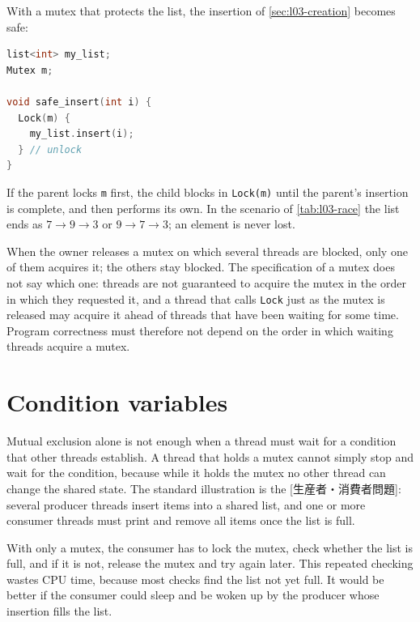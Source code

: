 \documentclass[../main.tex]{subfiles}
\begin{document}
\begin{example}
  With a mutex that protects the list, the insertion of
  \cref{sec:l03-creation} becomes safe:
  \begin{lstlisting}[language=C, numbers=none]
list<int> my_list;
Mutex m;

void safe_insert(int i) {
  Lock(m) {
    my_list.insert(i);
  } // unlock
}
\end{lstlisting}
  If the parent locks \texttt{m} first, the child blocks in \texttt{Lock(m)}
  until the parent's insertion is complete, and then performs its own.  In
  the scenario of \cref{tab:l03-race} the list ends as $7\to 9\to 3$ or
  $9\to 7\to 3$; an element is never lost.
\end{example}

When the owner releases a mutex on which several threads are blocked, only
one of them acquires it; the others stay blocked.  The specification of a
mutex does not say which one: threads are not guaranteed to acquire the
mutex in the order in which they requested it, and a thread that calls
\texttt{Lock} just as the mutex is released may acquire it ahead of threads
that have been waiting for some time.  Program correctness must
therefore not depend on the order in which waiting threads acquire a
mutex.

\section{Condition variables}
\label{sec:l03-condvar}

Mutual exclusion alone is not enough when a thread must wait for a
condition that other threads establish.  A thread that holds
a mutex cannot
simply stop and wait for the condition, because while it holds the mutex
no other thread can change the shared state.  The standard illustration is
the
[生産者・消費者問題]: several producer
threads insert items into a shared list, and one or more consumer threads
must print and remove all items once the list is full.

With only a mutex, the consumer has to lock the mutex, check whether the
list is full, and if it is not, release the mutex and try again later.  This
repeated checking wastes CPU time, because most checks find the list not yet
full.  It would be better if the consumer could sleep and be woken up by the
producer whose insertion fills the list.
\end{document}
